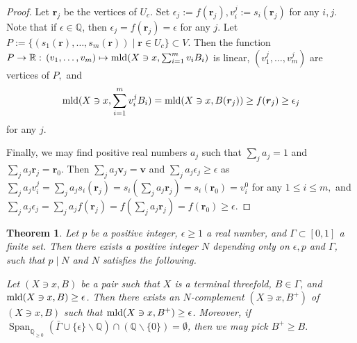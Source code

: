 \documentclass[11pt]{amsart}
\numberwithin{equation}{section}
\newcommand{\Qq}{\mathbb{Q}}
\newcommand{\Rr}{\mathbb{R}}
\newcommand{\Span}{\operatorname{Span}}
\newcommand{\mld}{{\rm{mld}}}
\newcommand{\Ii}{{\Gamma}}
\newtheorem{thm}{Theorem}[section]
\theoremstyle{definition}
\theoremstyle{definition}
\begin{document}
\begin{proof}
Let $\bm{r}_j$ be the vertices of $U_c$. Set $\epsilon_j:=f(\bm{r}_j),v_i^j:=s_i(\bm{r}_j)$ for any $i,j$. Note that if $\epsilon\in\Qq$, then $\epsilon_j=f(\bm{r}_j)=\epsilon$ for any $j$. Let $P:=\{(s_1(\bm{r}),\dots,s_m(\bm{r}))\mid \bm{r}\in U_c\}\subset V$. Then the function $P\to \Rr:\,(v_1,\ldots,v_m)\mapsto \mld(X\ni x,\sum_{i=1}^m v_iB_{i})$ is linear, $(v_1^j,\dots,v_m^j)$ are vertices of $P,$ and $$\mld(X\ni x,\sum_{i=1}^m v_i^jB_i)=\mld(X\ni x,B(\bm{r}_j))\ge f(\bm{r}_j)\ge\epsilon_j$$ for any $j$. 
      
Finally, we may find positive real numbers $a_j$ such that $\sum_{j} a_j=1$ and $\sum_{j} a_j\bm{r}_j=\bm{r}_0$. Then $\sum_{j} a_j\bm{v}_j=\bm{v}$ and $\sum_{j} a_j\epsilon_j\ge\epsilon$ as $\sum_j a_j v_i^j=\sum_j a_js_i(\bm{r}_j)=s_i(\sum_j a_j\bm{r}_j)=s_i(\bm{r}_0)=v_i^0$ for any $1\le i\le m,$ and $\sum_{j} a_j\epsilon_j=\sum_{j} a_jf(\bm{r}_j)=f(\sum_{j} a_j\bm{r}_j)=f(\bm{r}_0)\ge\epsilon.$
\end{proof}



\begin{thm}\label{ref: main epsilon comp threefolds finite set p version}
Let $p$ be a positive integer, $\epsilon\ge 1$ a real number, and $\Ii\subset [0,1]$ a finite set. Then there exists a positive integer $N$ depending only on $\epsilon,p$ and $\Ii$, such that $p\mid N$ and $N$ satisfies the following. 

Let $(X\ni x,B)$ be a pair such that $X$ is a terminal threefold, $B\in\Ii$, and $\mld(X\ni x,B)\geq \epsilon$. Then there exists an $N$-complement $(X\ni x,B^+)$ of $(X\ni x,B)$ such that $\mld(X\ni x,B^+)\geq \epsilon$. Moreover, if $\Span_{\Qq_{\ge0}}(\bar{\Ii}\cup\{\epsilon\}\backslash\Qq)\cap (\Qq\backslash\{0\})=\emptyset$, then we may pick $B^+\ge B.$ 
\end{thm}
\end{document}
